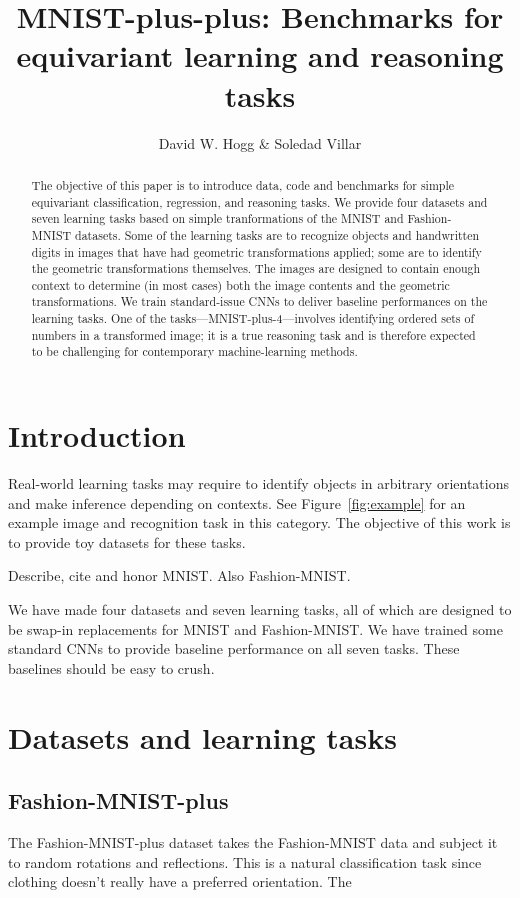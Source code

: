 \documentclass{article}
\title{\bfseries MNIST-plus-plus: Benchmarks for equivariant learning and reasoning tasks}
\author{David W. Hogg \& Soledad Villar}
\date{}
\begin{document}
\maketitle

\begin{abstract}\noindent
    The objective of this paper is to introduce data, code and benchmarks for simple equivariant classification, regression, and reasoning tasks.
    We provide four datasets and seven learning tasks based on simple tranformations of the MNIST and Fashion-MNIST datasets.
    Some of the learning tasks are to recognize objects and handwritten digits in images that have had geometric transformations applied; some are to identify the geometric transformations themselves.
    The images are designed to contain enough context to determine (in most cases) both the image contents and the geometric transformations.
    We train standard-issue CNNs to deliver baseline performances on the learning tasks.
    One of the tasks---MNIST-plus-4---involves identifying ordered sets of numbers in a transformed image; it is a true reasoning task and is therefore expected to be challenging for contemporary machine-learning methods.
\end{abstract}

\section{Introduction}

Real-world learning tasks may require to identify objects in arbitrary orientations and make inference depending on contexts. 
See Figure~\ref{fig:example} for an example image and recognition task in this category.
The objective of this work is to provide toy datasets for these tasks. 

Describe, cite and honor MNIST. Also Fashion-MNIST.

We have made four datasets and seven learning tasks, all of which are designed to be swap-in replacements for MNIST and Fashion-MNIST.
We have trained some standard CNNs to provide baseline performance on all seven tasks.
These baselines should be easy to crush.

\section{Datasets and learning tasks}

\subsection{Fashion-MNIST-plus}
The Fashion-MNIST-plus dataset takes the Fashion-MNIST data and subject it to random rotations and reflections. This is a natural classification task since clothing doesn't really have a preferred orientation.
The 
\end{document}
